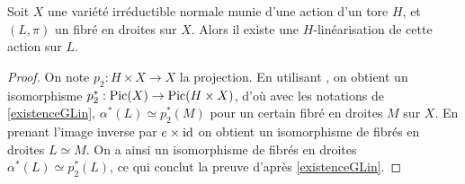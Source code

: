 \begin{lem}\label{existenceGLinTore}
Soit $X$ une variété irréductible normale munie d'une action d'un tore $H$, et $(L,\pi)$ un fibré en droites sur $X$. Alors il existe une $H$-linéarisation de cette action sur $L$.
\end{lem}
\begin{proof}
On note $p_2:H\times X\rightarrow X$ la projection. En utilisant \cite[II.6.6]{Hartshorne}, on obtient un isomorphisme $p_2^*:\operatorname{Pic}(X)\rightarrow \operatorname{Pic}(H\times X)$, d'où avec les notations de \ref{existenceGLin}, $\alpha^*(L)\simeq p_2^*(M)$ pour un certain fibré en droites $M$ sur $X$. En prenant l'image inverse par $e\times \operatorname{id}$ on obtient un isomorphisme de fibrés en droites $L\simeq M$. On a ainsi un isomorphisme de fibrés en droites $\alpha^*(L)\simeq p_2^*(L)$, ce qui conclut la preuve d'après \ref{existenceGLin}.
\end{proof}

